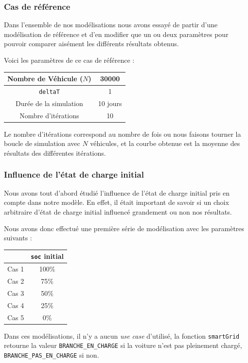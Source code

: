 			\subsubsection{Cas de référence}
			
			Dans l'ensemble de nos modélisations nous avons essayé de partir d'une modélisation de référence et d'en modifier que un ou deux paramètres pour pouvoir comparer aisément les différents résultats obtenus.
			
			Voici les paramètres de ce cas de référence :
			\begin{table}[h!]
			\centering
			\begin{tabular}{|c|c|}
			\hline
			Nombre de Véhicule ($N$) & 30000 \\
			\hline
			\lstinline|deltaT| & \SI{1}{\min} \\
			\hline
			Durée de la simulation & 10 jours \\
			\hline
			Nombre d'itérations & 10 \\
			\hline
			\end{tabular}
			\end{table}
			Le nombre d'itérations correspond au nombre de fois ou nous faisons tourner la boucle de simulation avec $N$ véhicules, et la courbe obtenue est la moyenne des résultats des différentes itérations.
			
			\subsubsection{Influence de l'état de charge initial}
				
				Nous avons tout d'abord étudié l'influence de l'état de charge initial pris en compte dans notre modèle. En effet, il était important de savoir si un choix arbitraire d'état de charge initial influencé grandement ou non nos résultats.
					
				Nous avons donc effectué une première série de modélisation avec les paramètres suivants :
				\begin{table}[h!]
				\centering
				
				\begin{tabular}{|c||c|}
					\hline
					& \lstinline|soc| initial\\
					\hline
					Cas 1 & 100\% \\
					\hline
					Cas 2 & 75\%\\
					\hline
					Cas 3 & 50\%\\
					\hline
					Cas 4 & 25\%\\
					\hline
					Cas 5 & 0\%\\
					\hline
				\end{tabular}
				\end{table}
				Dans ces modélisations, il n'y a aucun \emph{use case} d'utilisé, la fonction \lstinline|smartGrid| retourne la valeur \lstinline|BRANCHE_EN_CHARGE| si la voiture n'est pas pleinement chargé, \lstinline|BRANCHE_PAS_EN_CHARGE| si non.
				
